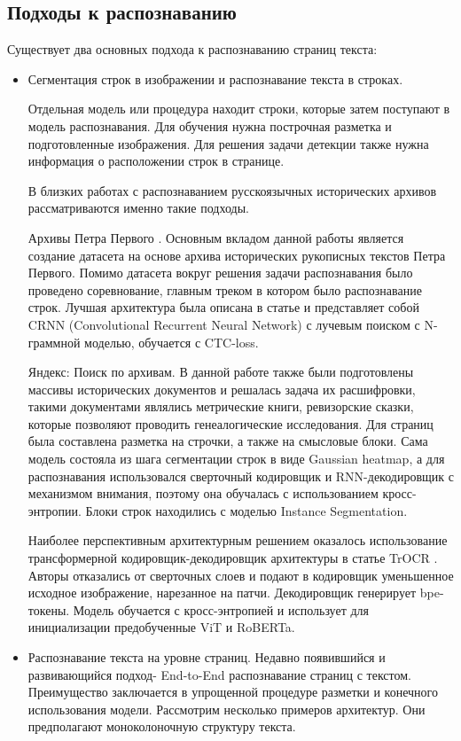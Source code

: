 \documentclass{extarticle}
\begin{document}
\subsection{Подходы к распознаванию}
Существует два основных подхода к распознаванию страниц текста:
\begin{itemize}
	\item Сегментация строк в изображении и распознавание текста в строках.
	
	Отдельная модель или процедура находит строки, которые затем поступают в модель распознавания. Для обучения нужна построчная разметка и подготовленные
	изображения. Для решения задачи детекции также нужна информация о расположении строк в странице.
	
	В близких работах с распознаванием русскоязычных исторических архивов рассматриваются именно такие подходы.
	
	Архивы Петра Первого \cite{peter_dataset}. Основным вкладом данной работы является создание датасета на основе архива исторических рукописных текстов Петра Первого.
	Помимо датасета вокруг решения задачи распознавания было проведено соревнование, главным треком в котором было распознавание строк. Лучшая архитектура
	была описана в статье и представляет собой CRNN (Convolutional Recurrent Neural
	Network) с лучевым поиском с N-граммной моделью, обучается с CTC-loss.

	Яндекс: Поиск по архивам. В данной работе также были подготовлены массивы
	исторических документов и решалась задача их расшифровки, такими документами являлись метрические книги, ревизорские сказки, которые позволяют проводить генеалогические исследования. Для страниц была составлена разметка на
	строчки, а также на смысловые блоки. Сама модель состояла из шага сегментации строк в виде Gaussian heatmap, а для распознавания использовался сверточный кодировщик и RNN-декодировщик с механизмом внимания, поэтому она
	обучалась с использованием кросс-энтропии. Блоки строк находились с моделью
	Instance Segmentation.

	Наиболее перспективным архитектурным решением оказалось использование трансформерной кодировщик-декодировщик архитектуры в статье TrOCR \cite{TrOCR}. Авторы
	отказались от сверточных слоев и подают в кодировщик уменьшенное исходное
	изображение, нарезанное на патчи. Декодировщик генерирует bpe-токены. Модель
	обучается с кросс-энтропией и использует для инициализации предобученные ViT
	и RoBERTa.
	
	\item Распознавание текста на уровне страниц.
	Недавно появившийся и развивающийся подход- End-to-End распознавание страниц с текстом. Преимущество заключается в упрощенной процедуре разметки и
	конечного использования модели. Рассмотрим несколько примеров архитектур.
	Они предполагают моноколоночную структуру текста.
	

\end{itemize}
\end{document}
